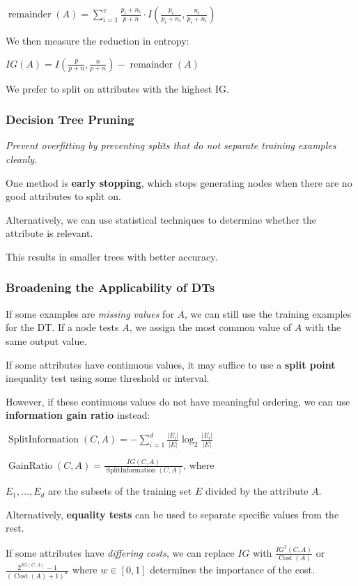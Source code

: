 $\operatorname{remainder}(A) = \sum_{i=1}^{v} \frac{p_i + n_i}{p + n} \cdot I\left( 
\frac{p_i}{p_i + n_i}, \frac{n_i}{p_i + n_i} \right)$

We then measure the reduction in entropy:

$IG(A) =I\left( \frac{p}{p+n}, \frac{n}{p+n} \right) - \operatorname{remainder}(A)$

We prefer to split on attributes with the highest IG.

\subsubsection{Decision Tree Pruning}
\emph{Prevent overfitting by preventing splits that do not separate training examples cleanly.}

One method is \textbf{early stopping}, which stops generating nodes when there are no good attributes
to split on.

Alternatively, we can use statistical techniques to determine whether the attribute is relevant.

This results in smaller trees with better accuracy.

\subsubsection{Broadening the Applicability of DTs}
If some examples are \emph{missing values} for $A$, we can still use the training examples for the DT.
If a node tests $A$, we assign the most common value of $A$ with the same output value.

If some attributes have continuous values, it may suffice to use a \textbf{split point} inequality test
using some threshold or interval.

However, if these continuous values do not have meaningful ordering, we can use \textbf{information gain ratio} instead:

$\operatorname{SplitInformation}(C, A) = -\sum_{i=1}^{d} \frac{|E_i|}{|E|} \log_2 \frac{|E_i|}{|E|}$

$\operatorname{GainRatio}(C, A) = \frac{IG(C, A)}{\operatorname{SplitInformation}(C, A)}$, where

$E_1, \dots, E_d$ are the subsets of the training set $E$ divided by the attribute $A$.

Alternatively, \textbf{equality tests} can be used to separate specific values from the rest.

If some attributes have \emph{differing costs}, we can replace $IG$ with 
$\frac{IG^2(C, A)}{\operatorname{Cost}(A)}$ or $\frac{2^{IG(C, A)} - 1}{(\operatorname{Cost}(A) + 1)^w}$
where $w \in [0, 1]$ determines the importance of the cost.

